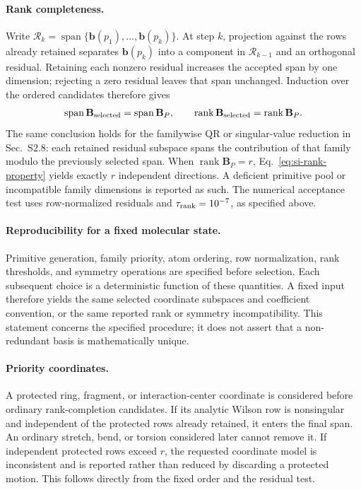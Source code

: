 \documentclass[10pt]{article}
\newcommand{\Bmat}{\mathbf{B}}
\begin{document}
\paragraph{Rank completeness.}
{Write \(\mathcal R_k=\operatorname{span}\{\mathbf b(p_1),
\ldots,\mathbf b(p_k)\}\). At step \(k\), projection against the rows already
retained separates \(\mathbf b(p_k)\) into a component in
\(\mathcal R_{k-1}\) and an orthogonal residual. Retaining each nonzero
residual increases the accepted span by one dimension; rejecting a zero
residual leaves that span unchanged. Induction over the ordered candidates
therefore gives}
\begin{equation}
 {\operatorname{span}\Bmat_{\rm selected}
 =\operatorname{span}\Bmat_P,\qquad
 \operatorname{rank}\Bmat_{\rm selected}=\operatorname{rank}\Bmat_P.}
 \label{eq:si-rank-property}
\end{equation}
{The same conclusion holds for the familywise QR or singular-value
reduction in Sec.~S2.8: each retained residual subspace spans the contribution
of that family modulo the previously selected span. When
\(\operatorname{rank}\Bmat_P=r\), Eq.~\ref{eq:si-rank-property} yields exactly
\(r\) independent directions. A deficient primitive pool or incompatible
family dimensions is reported as such. The numerical acceptance test uses
row-normalized residuals and \(\tau_{\rm rank}=10^{-7}\), as specified above.}

\paragraph{Reproducibility for a fixed molecular state.}
{Primitive generation, family priority, atom ordering,
row normalization, rank thresholds, and symmetry operations are specified
before selection. Each subsequent choice is a deterministic function of
these quantities. A fixed input therefore yields the same selected coordinate
subspaces and coefficient convention, or the same reported rank or symmetry
incompatibility. This statement concerns the specified procedure; it does
not assert that a non-redundant basis is mathematically unique.}

\paragraph{Priority coordinates.}
{A protected ring, fragment, or interaction-center coordinate
is considered before ordinary rank-completion candidates. If its analytic
Wilson row is nonsingular and independent of the protected rows already
retained, it enters the final span. An ordinary stretch, bend, or torsion
considered later cannot remove it. If independent protected rows exceed
\(r\), the requested coordinate model is inconsistent and is reported rather
than reduced by discarding a protected motion. This follows directly from
the fixed order and the residual test.}
\end{document}

